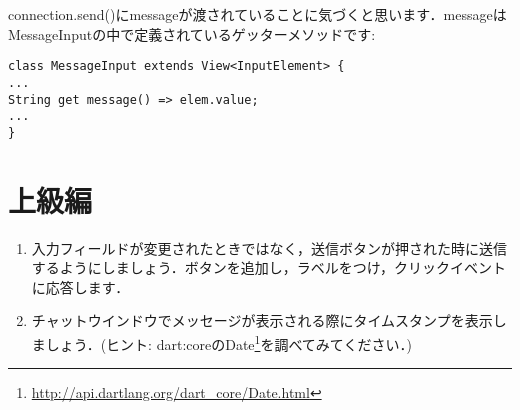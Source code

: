 connection.send()にmessageが渡されていることに気づくと思います．messageはMessageInputの中で定義されているゲッターメソッドです:

\begin{verbatim}
class MessageInput extends View<InputElement> {
...
String get message() => elem.value;
...
}
\end{verbatim}


\section{上級編}

\begin{enumerate}
\item 入力フィールドが変更されたときではなく，送信ボタンが押された時に送信するようにしましょう．ボタンを追加し，ラベルをつけ，クリックイベントに応答します．
\item チャットウインドウでメッセージが表示される際にタイムスタンプを表示しましょう．(ヒント: dart:coreのDate\footnote{\url{http://api.dartlang.org/dart_core/Date.html}}を調べてみてください．)
\end{enumerate}

\clearpage

